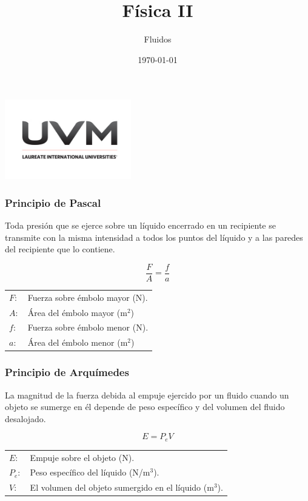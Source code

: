 \documentclass[handout]{beamer}
\title{Física II}
\author{Fluidos}
\institute[UVM]{4\textdegree \hspace{2pt} cuatrimestre.}
\date{\today}
\begin{document}
\begin{frame}[noframenumbering]
  \titlepage
  \begin{center}
    \includegraphics[width=5.5cm]{uvm1}    
  \end{center}  
\end{frame}


\begin{frame}
  \frametitle{Principio de Pascal}
  \begin{block}{}
    Toda presión que se ejerce sobre un líquido encerrado en un recipiente se transmite
    con la misma intensidad a todos los puntos del líquido y a las paredes del recipiente
    que lo contiene.
  \end{block}
  
  {\huge \[\frac{F}{A} = \frac{f}{a}\]}
  
  \begin{tabular}{ll}
    $F:$ & Fuerza sobre émbolo mayor (N).  \\ 
    $A:$ & Área del émbolo mayor (m$^2$) \\ 
    $f:$ & Fuerza sobre émbolo menor (N). \\
    $a:$ & Área del émbolo menor (m$^2$) \\
  \end{tabular}
\end{frame}



\begin{frame}
  \frametitle{Principio de Arquímedes}
  \begin{block}{}
    La magnitud de la fuerza debida al empuje ejercido por un fluido cuando un objeto se
    sumerge en él depende de peso específico y del volumen del fluido desalojado.   
  \end{block}
  {\huge \[E = P_{e}V\]}
  
  \begin{tabular}{ll}
    $E:$ & Empuje sobre el objeto (N).  \\ 
    $P_{e}:$ & Peso específico del líquido (N/m$^3$). \\ 
    $V:$ & El volumen del objeto sumergido en el líquido (m$^3$). \\
  \end{tabular}
\end{frame}
\end{document}

